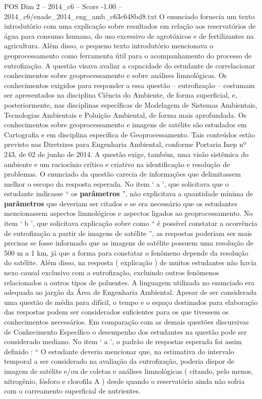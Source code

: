 \begin{textsample}{POS Dim 2 – 2014\_c6 – Score -1.00 – 2014\_c6/enade\_2014\_eng\_amb\_c63c648bd8.txt}
O enunciado fornecia um texto introdutório com uma explicação sobre resultados em relação aos reservatórios de água para consumo humano, do uso excessivo de agrotóxicos e de fertilizantes na agricultura.
Além disso, o pequeno texto introdutório mencionava o geoprocessamento como ferramenta útil para o acompanhamento do processo de eutrofização.
A questão visava avaliar a capacidade do estudante de correlacionar conhecimentos sobre geoprocessamento e sobre análises limnológicas.
Os conhecimentos exigidos para responder a essa questão – eutrofização – costumam ser apresentados na disciplina Ciência do Ambiente, de forma superficial, e, posteriormente, nas disciplinas específicas de Modelagem de Sistemas Ambientais, Tecnologias Ambientais e Poluição Ambiental, de forma mais aprofundada.
Os conhecimentos sobre geoprocessamento e imagens de satélite são estudados em Cartografia e em disciplina específica de Geoprocessamento.
Tais conteúdos estão previsto nas Diretrizes para Engenharia Ambiental, conforme Portaria Inep nº 243, de 02 de junho de 2014.
A questão exige, também, uma visão sistêmica do ambiente e um raciocínio crítico e criativo na identificação e resolução de problemas.
O enunciado da questão carecia de informações que delimitassem melhor o escopo da resposta esperada.
No item ‘ a ’, que solicitava que o estudante indicasse “ os \textbf{parâmetros} ”, não explicitava a quantidade mínima de \textbf{parâmetros} que deveriam ser citados e se era necessário que os estudantes mencionassem aspectos limnológicos e aspectos ligados ao geoprocessamento.
No item ‘ b ’, que solicitava explicação sobre como “ é possível constatar a ocorrência de eutrofização a partir de imagens de satélite ”, as respostas poderiam ser mais precisas se fosse informado que as imagens de satélite possuem uma resolução de 500 m a 1 km, já que a forma para constatar o fenômeno depende da resolução do satélite.
Além disso, na resposta ( explicação ) de muitos estudantes não havia nexo causal exclusivo com a eutrofização, excluindo outros fenômenos relacionados a outros tipos de poluentes.
A linguagem utilizada no enunciado era adequada ao jargão da Área de Engenharia Ambiental.
Apesar de ser considerada uma questão de média para difícil, o tempo e o espaço destinados para elaboração das respostas podem ser considerados suficientes para os que tivessem os conhecimentos necessários.
Em comparação com as demais questões discursivas de Conhecimento Específico o desempenho dos estudantes na questão pode ser considerado mediano.
No item ‘ a ’, o padrão de respostas esperada foi assim definido : “ O estudante deveria mencionar que, na estimativa do intervalo temporal a ser considerado na avaliação da eutrofização, poderia dispor de imagem de satélite e/ou de coletas e análises limnológicas ( citando, pelo menos, nitrogênio, fósforo e clorofila A ) desde quando o reservatório ainda não sofria com o carreamento superficial de nutrientes.

\end{textsample}
